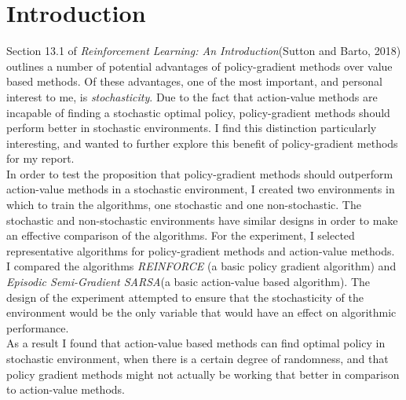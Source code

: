 \documentclass[10pt, letterpaper, twocolumn]{article}
\begin{document}
	
	
	\twocolumn[
	\begin{@twocolumnfalse}
		\maketitle
		\begin{abstract}
			\abstractText
			\newline
			\newline
		\end{abstract}
	\end{@twocolumnfalse}
	]
	
	
	\section{Introduction}
	
	\normalsize 
	\noindent Section 13.1 of \textit{Reinforcement Learning: An Introduction}(Sutton and Barto, 2018) outlines a number of potential advantages of policy-gradient methods over value based methods. Of these advantages, one of the most important, and personal interest to me, is \textit{stochasticity}. Due to the fact that action-value methods are incapable of finding a stochastic optimal policy, policy-gradient methods should perform better in stochastic environments. I find this distinction particularly interesting, and wanted to further explore this benefit of policy-gradient methods for my report.\\
	
	In order to test the proposition that policy-gradient methods should outperform action-value methods in a stochastic environment, I created two environments in which to train the algorithms, one stochastic and one non-stochastic. The stochastic and non-stochastic environments have similar designs in order to make an effective comparison of the algorithms. For the experiment, I selected representative algorithms for policy-gradient methods and action-value methods. I compared the algorithms \textit{REINFORCE} (a basic policy gradient algorithm) and \textit{Episodic Semi-Gradient SARSA}(a basic action-value based algorithm). The design of the experiment attempted to ensure that the stochasticity of the environment would be the only variable that would have an effect on algorithmic performance. \\
	
	As a result I found that action-value based methods can find optimal policy in stochastic environment, when there is a certain degree of randomness, and that policy gradient methods might not actually be working that better in comparison to action-value methods.
	
\end{document}
